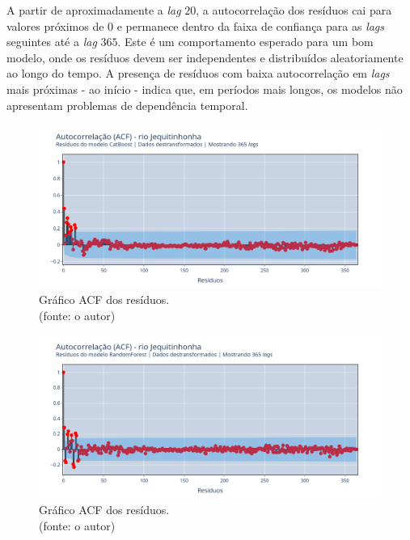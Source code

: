 A partir de aproximadamente a \textit{lag} $20$, a autocorrelação dos resíduos cai para valores próximos de $0$ e permanece dentro da faixa de confiança para as \textit{lags} seguintes até a \textit{lag} $365$. Este é um comportamento esperado para um bom modelo, onde os resíduos devem ser independentes e distribuídos aleatoriamente ao longo do tempo. A presença de resíduos com baixa autocorrelação em \textit{lags} mais próximas - ao início - indica que, em períodos mais longos, os modelos não apresentam problemas de dependência temporal.

\begin{figure}[!h]
	\centering
	\includegraphics[scale=0.33]{Figuras/jequiti/wfv/CB/CB_WFV_LOG_RESID_ACF.png}
	\caption{Gráfico ACF dos resíduos.\\(fonte: o autor)}
	\label{fig:jequiti_CB_WFV_LOG_RESID_ACF}
\end{figure}

\begin{figure}[!h]
	\centering
	\includegraphics[scale=0.33]{Figuras/jequiti/wfv/RF/RF_WFV_LOG_RESID_ACF.png}
	\caption{Gráfico ACF dos resíduos.\\(fonte: o autor)}
	\label{fig:jequiti_RF_WFV_LOG_RESID_ACF}
\end{figure}
\clearpage

